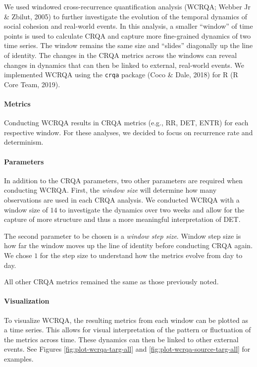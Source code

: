 \documentclass[english,man]{apa6}
\begin{document}
We used windowed cross-recurrence quantification analysis
(WCRQA; Webber Jr \& Zbilut, 2005) to further investigate the evolution of the
temporal dynamics of social cohesion and real-world events. In this analysis,
a smaller \enquote{window} of time points is used to calculate CRQA and capture more
fine-grained dynamics of two time series. The window remains the same size and
\enquote{slides} diagonally up the line of identity. The changes in the CRQA metrics
across the windows can reveal changes in dynamics that can then be linked to
external, real-world events.
We implemented WCRQA using the \texttt{crqa} package (Coco \& Dale, 2018) for R (R Core Team, 2019).

\hypertarget{metrics-1}{%
\paragraph{Metrics}\label{metrics-1}}

Conducting WCRQA results in CRQA metrics (e.g., RR, DET, ENTR) for each
respective window. For these analyses, we decided to focus on recurrence rate
and determinism.

\hypertarget{parameters-1}{%
\paragraph{Parameters}\label{parameters-1}}

In addition to the CRQA parameters, two other parameters are required when
conducting WCRQA. First, the \emph{window size}
will determine how many observations are used in each CRQA analysis. We
conducted WCRQA with a window size of \(14\) to investigate the dynamics over
two weeks and allow for the capture of more structure and thus a more
meaningful interpretation of DET.

The second parameter to be chosen is a \emph{window step size}.
Window step size is how far the window moves up the line of identity
before conducting CRQA again. We chose \(1\) for the step size to understand
how the metrics evolve from day to day.

All other CRQA metrics remained the same as those previously noted.

\hypertarget{visualization-1}{%
\paragraph{Visualization}\label{visualization-1}}

To visualize WCRQA, the resulting metrics from each window can be plotted
as a time series. This allows for visual interpretation of the pattern or
fluctuation of the metrics across time. These dynamics can then be linked
to other external events. See Figures \ref{fig:plot-wcrqa-targ-all} and
\ref{fig:plot-wcrqa-source-targ-all} for examples.
\end{document}
